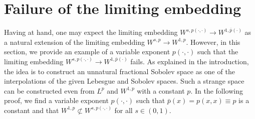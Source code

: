 \documentclass[11pt]{amsart}
\theoremstyle{plain}
\theoremstyle{definition}
\numberwithin{equation}{section}
\begin{document}

\section{Failure of the limiting embedding} \label{sec:failure}


Having  at hand, one may expect the limiting embedding $W^{s, p(\cdot, \cdot)} \to W^{1, \bar{p}(\cdot)}$ as a natural extension of the limiting embedding $W^{s, p} \to W^{1, p}$. However, in this section, we provide an example of a variable exponent $p(\cdot, \cdot)$ such that the limiting embedding $W^{s, p(\cdot, \cdot)} \to W^{1, \bar{p}(\cdot)}$ fails. As explained in the introduction, the idea is to construct an unnatural fractional Sobolev space as one of the interpolations of the given Lebesgue and Sobolev spaces. Such a strange space can be constructed even from $L^{p}$ and $W^{1, p}$ with a constant $p$. In the following proof, we find a variable exponent $p(\cdot, \cdot)$ such that $\bar{p}(x) = p(x, x) \equiv p$ is a constant and that $W^{1, p} \not\subset W^{s, p(\cdot, \cdot)}$ for all $s \in (0,1)$.
\end{document}

